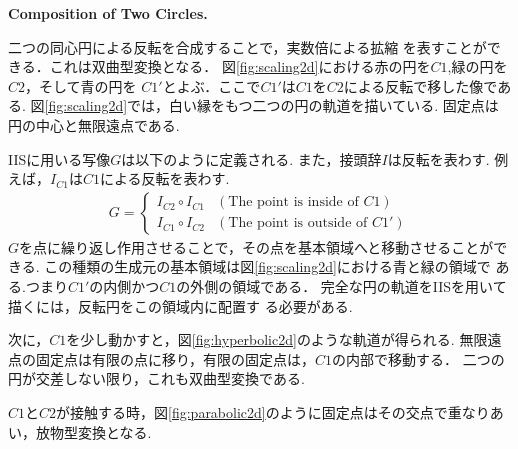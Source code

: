 \noindent\textbf{Composition of Two Circles.}

二つの同心円による反転を合成することで，実数倍による拡縮
を表すことができる．これは双曲型変換となる．
図\ref{fig:scaling2d}における赤の円を$C1$,緑の円を$C2$，そして青の円を
$C1'$とよぶ．ここで$C1'$は$C1$を$C2$による反転で移した像である.
図\ref{fig:scaling2d}では，白い縁をもつ二つの円の軌道を描いている.
固定点は円の中心と無限遠点である.

IISに用いる写像$G$は以下のように定義される.
また，接頭辞$I$は反転を表わす.
例えば，$I_{C1}$は$C1$による反転を表わす.
\begin{align*}
 G =
  \begin{cases}
   I_{C2} \circ I_{C1} & (\text{The point is inside of } C1) \\
   I_{C1} \circ I_{C2} & (\text{The point is outside of } C1')
  \end{cases}
\end{align*}
$G$を点に繰り返し作用させることで，その点を基本領域へと移動させることができる.
この種類の生成元の基本領域は図\ref{fig:scaling2d}における青と緑の領域で
ある.つまり$C1'$の内側かつ$C1$の外側の領域である．
完全な円の軌道をIISを用いて描くには，反転円をこの領域内に配置す
る必要がある.

次に，$C1$を少し動かすと，図\ref{fig:hyperbolic2d}のような軌道が得られる.
無限遠点の固定点は有限の点に移り，有限の固定点は，$C1$の内部で移動する．
二つの円が交差しない限り，これも双曲型変換である.

$C1$と$C2$が接触する時，図\ref{fig:parabolic2d}のように固定点はその交点で重なりあい，放物型変換となる.

